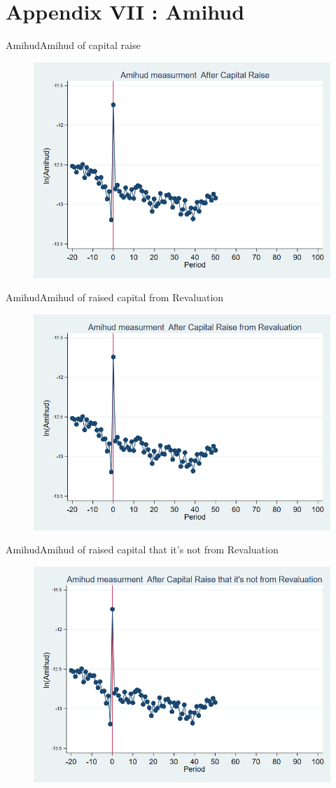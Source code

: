 \documentclass{beamer}
\begin{document}
					


\section{Appendix VII : Amihud}

\begin{frame}{Amihud}{Amihud of capital raise}
\begin{figure}
\centering
\includegraphics[width=0.7\linewidth]{Output/Amihud.png}
\label{fig:amihud}
\end{figure}
\end{frame}



\begin{frame}{Amihud}{Amihud of raised capital from Revaluation}
\begin{figure}
\centering
\includegraphics[width=0.7\linewidth]{Output/Amihud_Revaluation.png}
\label{fig:amihudrevaluation}
\end{figure}
\end{frame}

\begin{frame}{Amihud}{Amihud of raised capital that it's not from Revaluation}
\begin{figure}
\centering
\includegraphics[width=0.7\linewidth]{Output/Amihud_NoRevaluation.png}
\label{fig:amihudnorevaluation}
\end{figure}
\end{frame}
\end{document}
